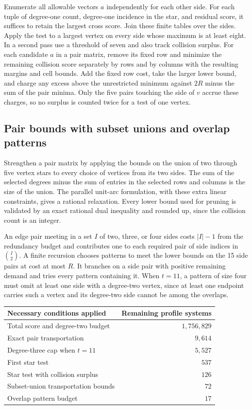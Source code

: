 Enumerate all allowable vectors $a$ independently for each other side.
For each tuple of degree-one count, degree-one incidence in the star,
and residual score, it suffices to retain the largest cross score.
Join these finite tables over the sides. Apply the test to a largest
vertex on every side whose maximum is at least eight. In a second
pass use a threshold of seven and also track collision surplus.
For each candidate $a$ in a pair matrix, remove its fixed row and
minimize the remaining collision score separately by rows and by
columns with the resulting margins and cell bounds. Add the fixed
row cost, take the larger lower bound, and charge any excess above
the unrestricted minimum against $2R$ minus the sum of the pair minima.
Only the five pairs touching the side of $v$ accrue these charges,
so no surplus is counted twice for a test of one vertex.

\subsection{Pair bounds with subset unions and overlap patterns}

Strengthen a pair matrix by applying the bounds on the union of
two through five vertex stars to every choice of vertices from
its two sides. The sum of the selected degrees minus the sum of
entries in the selected rows and columns is the size of the union.
The parallel unit-arc formulation, with these extra linear
constraints, gives a rational relaxation. Every lower bound used
for pruning is validated by an exact rational dual inequality
and rounded up, since the collision count is an integer.

An edge pair meeting in a set $I$ of two, three, or four sides costs
$|I|-1$ from the redundancy budget and contributes one to each required
pair of side indices in $\binom{I}{2}$. A finite recursion chooses
patterns to meet the lower bounds on the 15 side pairs at cost at most
$R$. It branches on a side pair with positive remaining demand and
tries every pattern containing it. When $t=11$, a pattern of size four
must omit at least one side with a degree-two vertex, since at least
one endpoint carries such a vertex and its degree-two side cannot be
among the overlaps.

\begin{center}
\begin{tabular}{l|r}
Necessary conditions applied & Remaining profile systems\\
\hline
Total score and degree-two budget & $1{,}756{,}829$\\
Exact pair transportation & $9{,}614$\\
Degree-three cap when $t=11$ & $5{,}527$\\
First star test & $537$\\
Star test with collision surplus & $126$\\
Subset-union transportation bounds & $72$\\
Overlap pattern budget & $17$
\end{tabular}
\end{center}

